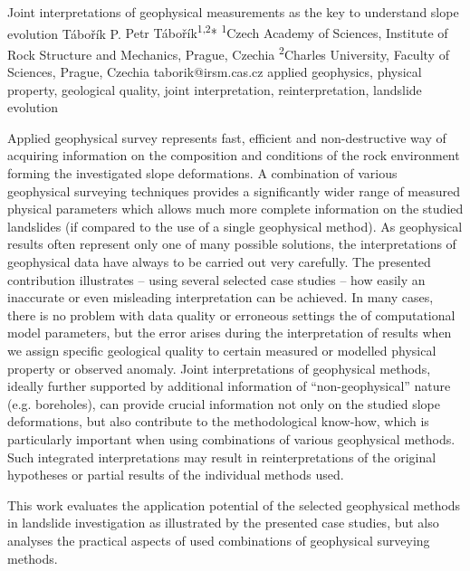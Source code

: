 \abstract
{Joint interpretations of geophysical measurements as the key to understand slope evolution} 
{Tábořík P.} 
{Petr Tábořík\textsuperscript{1,2}*} 
{\POtag} 
{
	\textsuperscript{1}Czech Academy of Sciences, Institute of Rock Structure and Mechanics, Prague, Czechia
	\textsuperscript{2}Charles University, Faculty of Sciences, Prague, Czechia
}
{taborik@irsm.cas.cz}  %
{applied geophysics, physical property, geological quality, joint interpretation, reinterpretation, landslide evolution}
{Applied geophysical survey represents fast, efficient and non-destructive way of acquiring information on the composition and conditions of the rock environment forming the investigated slope deformations. A combination of various geophysical surveying techniques provides a significantly wider range of measured physical parameters which allows much more complete information on the studied landslides (if compared to the use of a single geophysical method). As geophysical results often represent only one of many possible solutions, the interpretations of geophysical data have always to be carried out very carefully. The presented contribution illustrates -- using several selected case studies -- how easily an inaccurate or even misleading interpretation can be achieved. In many cases, there is no problem with data quality or erroneous settings the of computational model parameters, but the error arises during the interpretation of results when we assign specific geological quality to certain measured or modelled physical property or observed anomaly. Joint interpretations of geophysical methods, ideally further supported by additional information of \enquote{non-geophysical} nature (e.g. boreholes), can provide crucial information not only on the studied slope deformations, but also contribute to the methodological know-how, which is particularly important when using combinations of various geophysical methods. Such integrated interpretations may result in reinterpretations of the original hypotheses or partial results of the individual methods used.

This work evaluates the application potential of the selected geophysical methods in landslide investigation as illustrated by the presented case studies, but also analyses the practical aspects of used combinations of geophysical surveying methods. 
}
{
}

